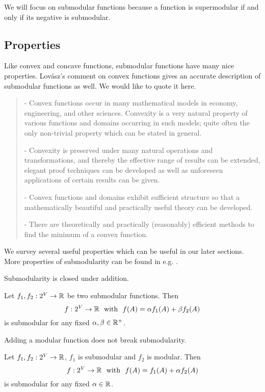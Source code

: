 We will focus on submodular functions because a function is supermodular if and only if its negative is submodular. 



\subsection{Properties}
Like convex and concave functions, submodular functions have many nice properties. Lov{\'a}sz's comment on convex functions \cite{L83} gives an accurate description of submodular functions as well. We would like to quote it here. 
\begin{quote}
 - Convex functions occur in many mathematical models in economy,
engineering, and other sciences. Convexity is a very natural property
of various functions and domains occurring in such models; quite
often the only non-trivial property which can be stated in general.

- Convexity is preserved under many natural operations and
transformations, and thereby the effective range of results can be
extended, elegant proof techniques can be developed as well as
unforeseen applications of certain results can be given.

- Convex functions and domains exhibit sufficient structure so that a
mathematically beautiful and practically useful theory can be
developed.

- There are theoretically and practically (reasonably) efficient methods
to find the minimum of a convex function.
\end{quote}

We survey several useful properties which can be useful in our later sections. More properties of submodularity can be found in e.g. \cite{B14,F05}.





Submodularity is closed under addition.
\begin{property}
  \label{prop:addition}
  Let $f_1, f_2: 2^V \rightarrow \mathbb{R}$ be two submodular functions. Then 
  $$f: 2^V\rightarrow \mathbb{R}~~\text{with}~~ f(A) = \alpha f_1(A) + \beta f_2(A)$$ 
is submodular for any fixed $\alpha, \beta \in \mathbb{R}^+$.
\end{property}


Adding a modular function does not break submodularity.
\begin{property}
  \label{prop:modular}
  Let $f_1, f_2: 2^V \rightarrow \mathbb{R}$, $f_1$ is submodular and $f_2$ is modular. Then
  $$f: 2^V \rightarrow \mathbb{R}~~\text{with}~~ f(A) = f_1(A) + \alpha f_2(A)$$
is submodular for any fixed $\alpha \in \mathbb{R}$.
\end{property}

